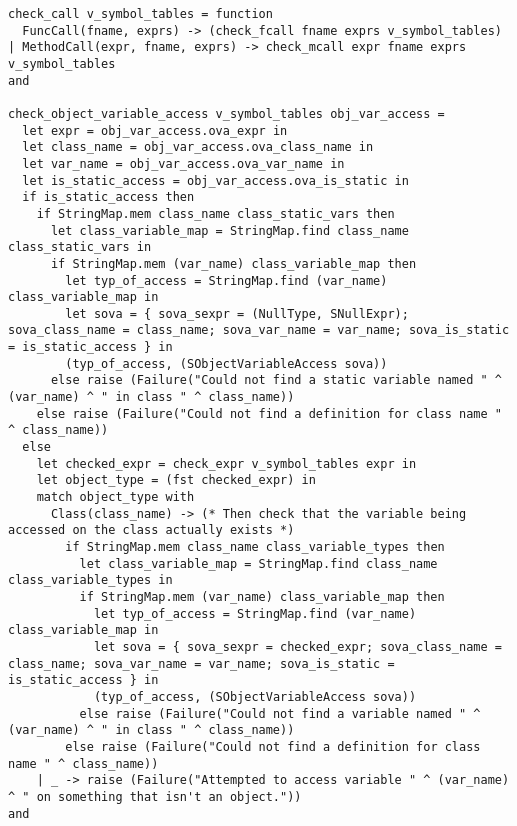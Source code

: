 \documentclass{article}
\begin{document}
\begin{verbatim}
check_call v_symbol_tables = function
  FuncCall(fname, exprs) -> (check_fcall fname exprs v_symbol_tables)
| MethodCall(expr, fname, exprs) -> check_mcall expr fname exprs v_symbol_tables
and

check_object_variable_access v_symbol_tables obj_var_access =
  let expr = obj_var_access.ova_expr in
  let class_name = obj_var_access.ova_class_name in
  let var_name = obj_var_access.ova_var_name in
  let is_static_access = obj_var_access.ova_is_static in
  if is_static_access then
    if StringMap.mem class_name class_static_vars then
      let class_variable_map = StringMap.find class_name class_static_vars in
      if StringMap.mem (var_name) class_variable_map then
        let typ_of_access = StringMap.find (var_name) class_variable_map in
        let sova = { sova_sexpr = (NullType, SNullExpr); sova_class_name = class_name; sova_var_name = var_name; sova_is_static = is_static_access } in
        (typ_of_access, (SObjectVariableAccess sova))
      else raise (Failure("Could not find a static variable named " ^ (var_name) ^ " in class " ^ class_name))
    else raise (Failure("Could not find a definition for class name " ^ class_name))
  else
    let checked_expr = check_expr v_symbol_tables expr in
    let object_type = (fst checked_expr) in
    match object_type with
      Class(class_name) -> (* Then check that the variable being accessed on the class actually exists *)
        if StringMap.mem class_name class_variable_types then
          let class_variable_map = StringMap.find class_name class_variable_types in
          if StringMap.mem (var_name) class_variable_map then
            let typ_of_access = StringMap.find (var_name) class_variable_map in
            let sova = { sova_sexpr = checked_expr; sova_class_name = class_name; sova_var_name = var_name; sova_is_static = is_static_access } in
            (typ_of_access, (SObjectVariableAccess sova))
          else raise (Failure("Could not find a variable named " ^ (var_name) ^ " in class " ^ class_name))
        else raise (Failure("Could not find a definition for class name " ^ class_name))
    | _ -> raise (Failure("Attempted to access variable " ^ (var_name) ^ " on something that isn't an object."))
and


\end{verbatim}
\end{document}
